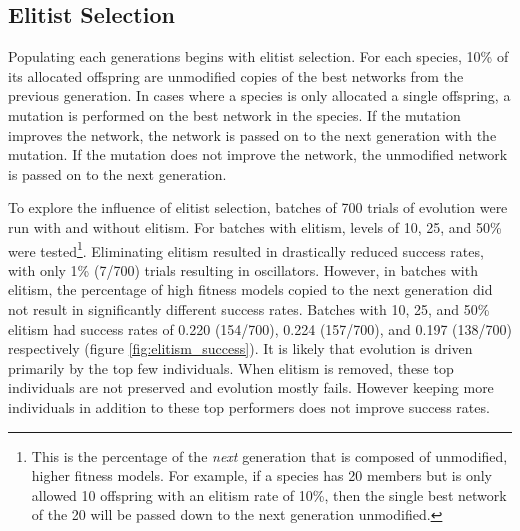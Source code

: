 \documentclass[12pt]{report}
\begin{document}
\subsection{Elitist Selection}
\label{section:elites}
Populating each generations begins with elitist selection. For each species, 10\% of its allocated offspring are unmodified copies of the best networks from the previous generation. In cases where a species is only allocated a single offspring, a mutation is performed on the best network in the species. If the mutation improves the network, the network is passed on to the next generation with the mutation. If the mutation does not improve the network, the unmodified network is passed on to the next generation.

To explore the influence of elitist selection, batches of 700 trials of evolution were run with and without elitism. For batches with elitism, levels of 10, 25, and 50\% were tested\footnote{This is the percentage of the \textit{next} generation that is composed of unmodified, higher fitness models. For example, if a species has 20 members but is only allowed 10 offspring with an elitism rate of 10\%, then the single best network of the 20 will be passed down to the next generation unmodified.}. Eliminating elitism resulted in drastically reduced success rates, with only 1\% (7/700) trials resulting in oscillators. However, in batches with elitism, the percentage of high fitness models copied to the next generation did not result in significantly different success rates. Batches with 10, 25, and 50\% elitism had success rates of 0.220 (154/700), 0.224 (157/700), and 0.197 (138/700) respectively (figure \ref{fig:elitism_success}). It is likely that evolution is driven primarily by the top few individuals. When elitism is removed, these top individuals are not preserved and evolution mostly fails. However keeping more individuals in addition to these top performers does not improve success rates.
\end{document}
